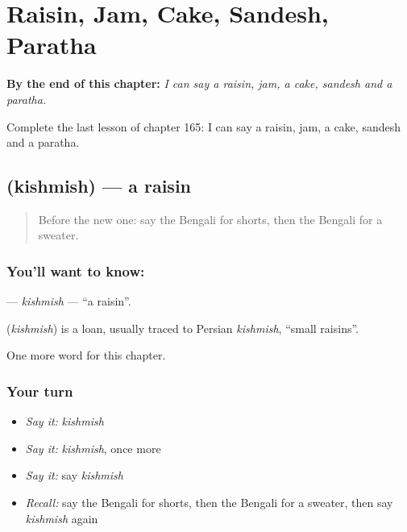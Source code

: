 
\chapter{Raisin, Jam, Cake, Sandesh, Paratha}
\label{ch:bn-raisin-jam-cake-sandesh-paratha}

\begin{chapteropening}
\textbf{By the end of this chapter:} \emph{I can say a raisin, jam, a cake, sandesh and a paratha.}

Complete the last lesson of chapter 165: I can say a raisin, jam, a cake, sandesh and a paratha.
\end{chapteropening}

\section[\texorpdfstring{\bn{কিশমিশ} (kishmish)}{কিশমিশ (kishmish)}]{ (kishmish) — a raisin}

\label{lesson:BN-C165-kishmish}



\begin{quote}
Before the new one: say the Bengali for shorts, then the Bengali for a sweater.
\end{quote}

\subsection*{You'll want to know: }
\textbf{} — \emph{kishmish} — \textquotedblleft{}a raisin\textquotedblright{}.

\begin{cousinweb}
\textbf{} (\emph{kishmish}) is a loan, usually traced to Persian \emph{kishmish}, \textquotedblleft{}small raisins\textquotedblright{}.
\end{cousinweb}

\begin{grammarlens}[title={What you've built}]
One more word for this chapter.
\end{grammarlens}

\subsection*{Your turn}
\begin{itemize}
\raggedright
  \item \emph{Say it:} \emph{kishmish}
  \item \emph{Say it:} \emph{kishmish}, once more
  \item \emph{Say it:} say \emph{kishmish}
  \item \emph{Recall:} say the Bengali for shorts, then the Bengali for a sweater, then say \emph{kishmish} again
\end{itemize}

